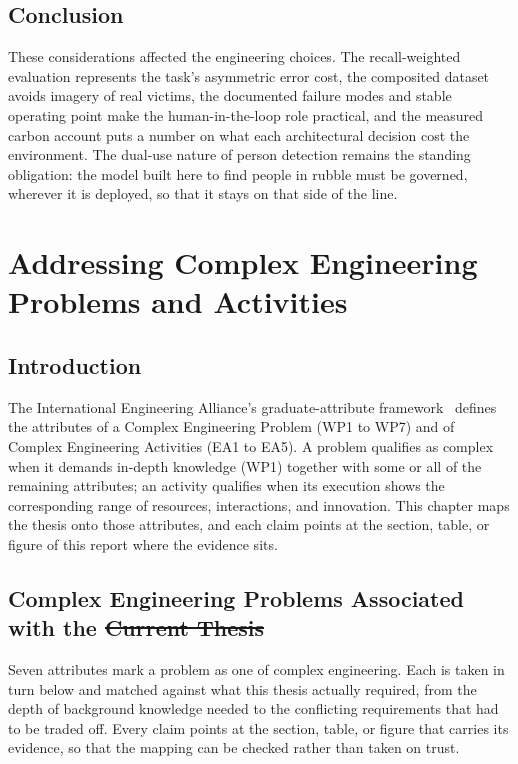 \documentclass[12pt,a4paper,oneside]{report}
\providecommand{\DIFadd}[1]{{\protect\color{blue}\uwave{#1}}} %
\providecommand{\DIFdel}[1]{{\protect\color{red}\sout{#1}}}                      %
\providecommand{\DIFaddbegin}{} %
\providecommand{\DIFaddend}{} %
\providecommand{\DIFdelbegin}{} %
\providecommand{\DIFdelend}{} %
\begin{document}
\section{Conclusion}
These considerations affected the engineering choices. The recall-weighted
evaluation represents the task's asymmetric error cost, the
composited dataset avoids imagery of real victims, the documented failure
modes and stable operating point make the human-in-the-loop role practical,
and the measured carbon account puts a number on what each architectural
decision cost the environment. The dual-use nature of person detection
remains the standing obligation: the model built here to find people in
rubble must be governed, wherever it is deployed, so that it stays on that
side of the line.
 \newpage 
 \newpage \chapter{Addressing Complex Engineering Problems and Activities}

\section{Introduction}
The International Engineering Alliance's graduate-attribute
framework~\cite{iea2021gapc} defines the
attributes of a Complex Engineering Problem (WP1 to WP7) and of Complex
Engineering Activities (EA1 to EA5). A problem qualifies as complex when it
demands in-depth knowledge (WP1) together with some or all of the remaining
attributes; an activity qualifies when its execution shows the corresponding
range of resources, interactions, and innovation. This chapter maps the
thesis onto those attributes, and each claim points at the section, table,
or figure of this report where the evidence sits.

\section{Complex Engineering Problems Associated with the \DIFdelbegin \DIFdel{Current Thesis}\DIFdelend \DIFaddbegin \DIFadd{Work}\DIFaddend }

Seven attributes mark a problem as one of complex engineering. Each is taken in
turn below and matched against what this thesis actually required, from the depth
of background knowledge needed to the conflicting requirements that had to be
traded off. Every claim points at the section, table, or figure that carries its
evidence, so that the mapping can be checked rather than taken on trust.
\end{document}
